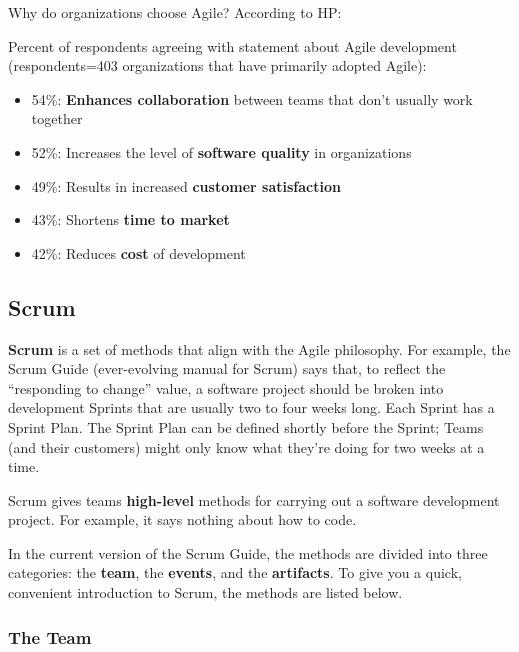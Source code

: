 Why do organizations choose Agile? According to HP:

\spacer
\noindent Percent of respondents agreeing with statement about Agile development (respondents=403 organizations that have primarily adopted Agile):

\begin{itemize}
\item 54\%: \textbf{Enhances collaboration} between teams that don't usually work together
\item 52\%: Increases the level of \textbf{software quality} in organizations
\item 49\%: Results in increased \textbf{customer satisfaction}
\item 43\%: Shortens \textbf{time to market}
\item 42\%: Reduces \textbf{cost} of development
\end{itemize}


\subsection{Scrum}

\textbf{Scrum} is a set of methods that align with the Agile philosophy. For example, the Scrum Guide (ever-evolving manual for Scrum) \parencite{schwaber2020scrum} says that, to reflect the ``responding to change'' value, a software project should be broken into development Sprints that are usually two to four weeks long. Each Sprint has a Sprint Plan. The Sprint Plan can be defined shortly before the Sprint; Teams (and their customers) might only know what they're doing for two weeks at a time.

Scrum gives teams \textbf{high-level} methods for carrying out a software development project. For example, it says nothing about how to code.

In the current version of the Scrum Guide, the methods are divided into three categories: the \textbf{team}, the \textbf{events}, and the \textbf{artifacts}. To give you a quick, convenient introduction to Scrum, the methods are listed below.

\subsubsection{The Team}

